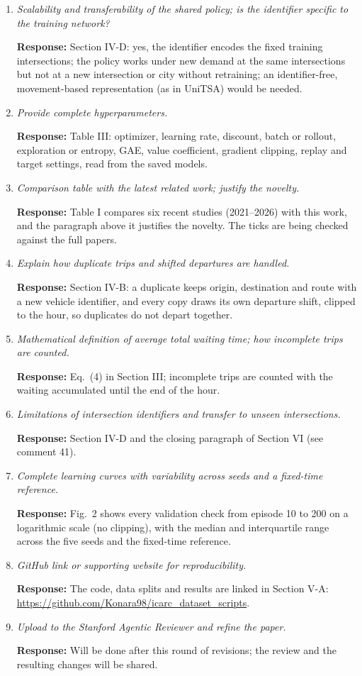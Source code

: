 \documentclass[11pt,a4paper]{article}
\newcommand{\cm}[2]{\item[\textbf{#1.}] \textit{#2}\par}
\newcommand{\re}{\par\textbf{Response:} }
\begin{document}
\begin{enumerate}[leftmargin=*, label={}, itemsep=6pt]
\cm{41}{Scalability and transferability of the shared policy; is the identifier specific to the training network?}
\re Section IV-D: yes, the identifier encodes the fixed training intersections; the policy works under new demand at the same intersections but not at a new intersection or city without retraining; an identifier-free, movement-based representation (as in UniTSA) would be needed.

\cm{42}{Provide complete hyperparameters.}
\re Table III: optimizer, learning rate, discount, batch or rollout, exploration or entropy, GAE, value coefficient, gradient clipping, replay and target settings, read from the saved models.

\cm{43}{Comparison table with the latest related work; justify the novelty.}
\re Table I compares six recent studies (2021--2026) with this work, and the paragraph above it justifies the novelty. The ticks are being checked against the full papers.

\cm{44}{Explain how duplicate trips and shifted departures are handled.}
\re Section IV-B: a duplicate keeps origin, destination and route with a new vehicle identifier, and every copy draws its own departure shift, clipped to the hour, so duplicates do not depart together.

\cm{45}{Mathematical definition of average total waiting time; how incomplete trips are counted.}
\re Eq.~(4) in Section III; incomplete trips are counted with the waiting accumulated until the end of the hour.

\cm{46}{Limitations of intersection identifiers and transfer to unseen intersections.}
\re Section IV-D and the closing paragraph of Section VI (see comment 41).

\cm{47}{Complete learning curves with variability across seeds and a fixed-time reference.}
\re Fig.~2 shows every validation check from episode 10 to 200 on a logarithmic scale (no clipping), with the median and interquartile range across the five seeds and the fixed-time reference.

\cm{48}{GitHub link or supporting website for reproducibility.}
\re The code, data splits and results are linked in Section V-A: \url{https://github.com/Konara98/icarc_dataset_scripts}.

\cm{49}{Upload to the Stanford Agentic Reviewer and refine the paper.}
\re Will be done after this round of revisions; the review and the resulting changes will be shared.

\end{enumerate}
\end{document}
